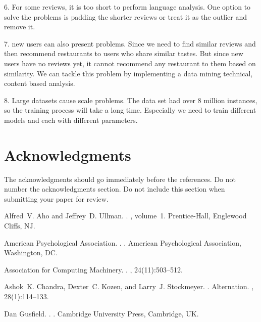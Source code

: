 \documentclass[11pt]{article}
\begin{document}
6. For some reviews, it is too short to perform language analysis. One option to solve the problems is padding the shorter reviews or treat it as the outlier and remove it. 

7. new users can also present problems. Since we need to find similar reviews and then recommend restaurants to users who share similar tastes. But since new users have no reviews yet, it cannot recommend any restaurant to them based on similarity. We can tackle this problem by implementing a data mining technical, content based analysis. 

8. Large datasets cause scale problems. The data set had over 8 million instances, so the training process will take a long time. Especially we need to train different models and each with different parameters. 



\section*{Acknowledgments}

The acknowledgments should go immediately before the references.  Do
not number the acknowledgments section. Do not include this section
when submitting your paper for review.




\begin{thebibliography}{}

Alfred~V. Aho and Jeffrey~D. Ullman.
.
, volume~1.
\newblock Prentice-{Hall}, Englewood Cliffs, NJ.

{American Psychological Association}.
.
.
\newblock American Psychological Association, Washington, DC.

{Association for Computing Machinery}.
.
, 24(11):503--512.

Ashok~K. Chandra, Dexter~C. Kozen, and Larry~J. Stockmeyer.
.
\newblock Alternation.
,
  28(1):114--133.

Dan Gusfield.
.
.
\newblock Cambridge University Press, Cambridge, UK.

\end{thebibliography}
\end{document}
